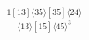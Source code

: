 \documentclass[varwidth, border=5pt]{standalone}
\begin{document}
\begin{my}
$\begin{gathered}
\scriptscriptstyle\frac{1[13]⟨35⟩[35]⟨24⟩}{⟨13⟩[15]⟨45⟩^3}
\end{gathered}$
\end{my}
\end{document}
